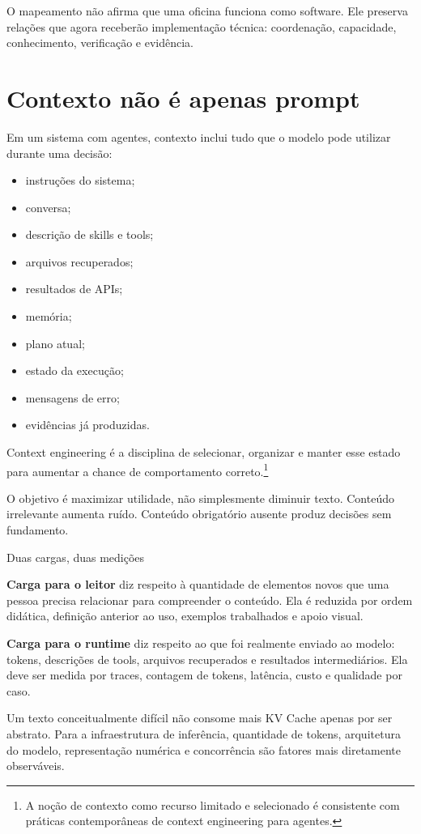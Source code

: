\documentclass[
  10pt,
  a4paper,
  oneside]{book}
\providecommand{\tightlist}{%
  \setlength{\itemsep}{0pt}\setlength{\parskip}{0pt}}
\begin{document}
O mapeamento não afirma que uma oficina funciona como software. Ele
preserva relações que agora receberão implementação técnica:
coordenação, capacidade, conhecimento, verificação e evidência.

\hypertarget{contexto-nuxe3o-uxe9-apenas-prompt}{%
\section{Contexto não é apenas
prompt}\label{contexto-nuxe3o-uxe9-apenas-prompt}}

Em um sistema com agentes, contexto inclui tudo que o modelo pode
utilizar durante uma decisão:

\begin{itemize}
\tightlist
\item
  instruções do sistema;
\item
  conversa;
\item
  descrição de skills e tools;
\item
  arquivos recuperados;
\item
  resultados de APIs;
\item
  memória;
\item
  plano atual;
\item
  estado da execução;
\item
  mensagens de erro;
\item
  evidências já produzidas.
\end{itemize}

Context engineering é a disciplina de selecionar, organizar e manter
esse estado para aumentar a chance de comportamento correto.\footnote{A
  noção de contexto como recurso limitado e selecionado é consistente
  com práticas contemporâneas de context engineering para agentes.}

O objetivo é maximizar utilidade, não simplesmente diminuir texto.
Conteúdo irrelevante aumenta ruído. Conteúdo obrigatório ausente produz
decisões sem fundamento.


\begin{infobox}{Duas cargas, duas medições}

\textbf{Carga para o leitor} diz respeito à quantidade de elementos
novos que uma pessoa precisa relacionar para compreender o conteúdo. Ela
é reduzida por ordem didática, definição anterior ao uso, exemplos
trabalhados e apoio visual.

\textbf{Carga para o runtime} diz respeito ao que foi realmente enviado
ao modelo: tokens, descrições de tools, arquivos recuperados e
resultados intermediários. Ela deve ser medida por traces, contagem de
tokens, latência, custo e qualidade por caso.

Um texto conceitualmente difícil não consome mais KV Cache apenas por
ser abstrato. Para a infraestrutura de inferência, quantidade de tokens,
arquitetura do modelo, representação numérica e concorrência são fatores
mais diretamente observáveis.

\end{infobox}
\end{document}
